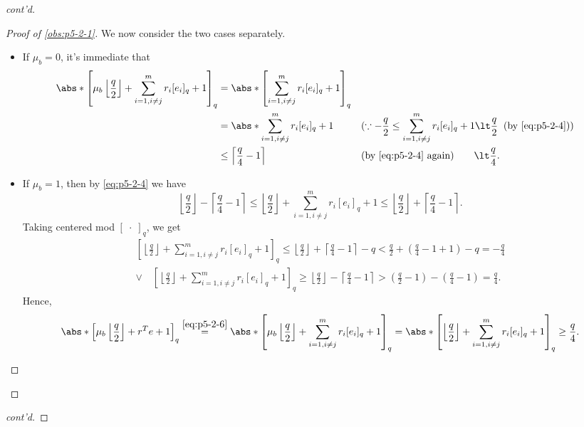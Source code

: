 \begin{answer}[ii]
\begin{proof}[cont'd]
\begin{proof}[Proof of \autoref{obs:p5-2-1}]
            We now consider the two cases separately.
            \begin{itemize}
                \item If $\mu_b=0$, it's immediate that
                \begin{align*}
                    \abs*{\left[\mu_b\left\lfloor \frac{q}{2}\right\rfloor+ \sum_{i=1, i\neq j}^m r_i[e_i]_q + 1 \right]_q}
                    &= \abs*{\left[\sum_{i=1, i\neq j}^m r_i[e_i]_q + 1 \right]_q}\\
                    &= \abs*{\sum_{i=1, i\neq j}^m r_i[e_i]_q + 1 }
                    &&(\because -\frac{q}{2}\le \sum_{i=1, i\neq j}^m r_i[e_i]_q +1 \lt \frac{q}{2} \;\; (\textrm{by \eqref{eq:p5-2-4}}))\\
                    &\le \left\lceil\frac{q}{4}-1\right\rceil
                    && (\textrm{by \eqref{eq:p5-2-4} again})
                    \qquad \lt \frac{q}{4}.
                \end{align*}
                \item If $\mu_b=1$, then by \eqref{eq:p5-2-4} we have
                \[
                    \left\lfloor \frac{q}{2}\right\rfloor - \left\lceil\frac{q}{4}-1\right\rceil
                    \le \left\lfloor \frac{q}{2}\right\rfloor+ \sum_{i=1, i\neq j}^m r_i[e_i]_q + 1
                    \le \left\lfloor \frac{q}{2}\right\rfloor + \left\lceil\frac{q}{4}-1\right\rceil.
                \]
                Taking centered mod $[\;\cdot\;]_q$, we get
                \begin{multline*}
                    \left[ \left\lfloor \frac{q}{2}\right\rfloor+ \sum_{i=1, i\neq j}^m r_i[e_i]_q + 1\right]_q
                    \le \left\lfloor \frac{q}{2}\right\rfloor + \left\lceil\frac{q}{4}-1\right\rceil-q \lt \frac{q}{2}+\left(\frac{q}{4}-1+1\right)-q = -\frac{q}{4}
                    \\\lor \quad 
                    \left[ \left\lfloor \frac{q}{2}\right\rfloor+ \sum_{i=1, i\neq j}^m r_i[e_i]_q + 1\right]_q
                    \ge \left\lfloor \frac{q}{2}\right\rfloor - \left\lceil\frac{q}{4}-1\right\rceil
                    \gt \left(\frac{q}{2}-1\right)-\left(\frac{q}{4}-1\right)=\frac{q}{4}.
                \end{multline*}
                Hence, 
                \[
                    \abs*{\left[\mu_b\left\lfloor \frac{q}{2}\right\rfloor+ r^Te+1 \right]_q}
                    \stackrel{\eqref{eq:p5-2-6}}=\abs*{\left[\mu_b\left\lfloor \frac{q}{2}\right\rfloor+ \sum_{i=1, i\neq j}^m r_i[e_i]_q + 1 \right]_q}
                    =\abs*{\left[\left\lfloor \frac{q}{2}\right\rfloor+ \sum_{i=1, i\neq j}^m r_i[e_i]_q + 1 \right]_q}
                    \ge \frac{q}{4}.
                \]
            \end{itemize}
        \end{proof}
        \end{proof}\begin{proof}[cont'd]
        \leavevmode\par


\end{proof}
\end{answer}
